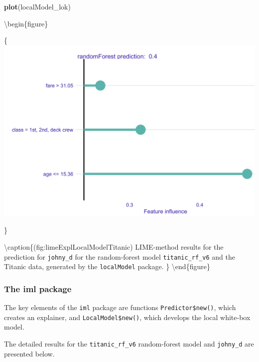 \documentclass[12pt,]{krantz}
\newenvironment{Shaded}{\begin{snugshade}}{\end{snugshade}}
\newcommand{\KeywordTok}[1]{\textcolor[rgb]{0.13,0.29,0.53}{\textbf{#1}}}
\newcommand{\NormalTok}[1]{#1}
\begin{document}
\begin{Shaded}
\begin{Highlighting}[]
\KeywordTok{plot}\NormalTok{(localModel_lok)}
\end{Highlighting}
\end{Shaded}

\textbackslash{}begin\{figure\}

\{\centering \includegraphics[width=0.6\linewidth]{figure/lime_expl_localModel_titanic}

\}

\textbackslash{}caption\{(fig:limeExplLocalModelTitanic) LIME-method results for the prediction for \texttt{johny\_d} for the random-forest model \texttt{titanic\_rf\_v6} and the Titanic data, generated by the \texttt{localModel} package. \}\label{fig:limeExplLocalModelTitanic}
\textbackslash{}end\{figure\}

\hypertarget{the-iml-package}{%
\subsubsection{The iml package}\label{the-iml-package}}

The key elements of the \texttt{iml} package are functions \texttt{Predictor\$new()}, which creates an explainer, and \texttt{LocalModel\$new()}, which develops the local white-box model.

The detailed results for the \texttt{titanic\_rf\_v6} random-forest model and \texttt{johny\_d} are presented below.
\end{document}
